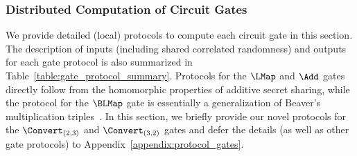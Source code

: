 \subsubsection{Distributed Computation of Circuit Gates}
We provide detailed (local) protocols to compute each circuit gate in this section. The description of inputs (including shared correlated randomness) and outputs for each gate protocol is also summarized in Table~\ref{table:gate_protocol_summary}. 
\iffull\else Protocols for the $\LMap$ and $\Add$ gates directly follow from the homomorphic properties of additive secret sharing, while the protocol for the $\BLMap$ gate is essentially a generalization of Beaver's multiplication triples~\cite{boyle2019-fss-preprocess,beaver1991-triples}. In this section, we briefly provide our novel protocols for the $\Convert_{(2,3)}$ and $\Convert_{(3,2)}$ gates and defer the details (as well as other gate protocols) to Appendix~\ref{appendix:protocol_gates}.\fi
\fi
\begin{table}[t!]
\caption{Summary of input, output, and randomness for circuit gate protocols.
}
\label{table:gate_protocol_summary}
\end{table}

